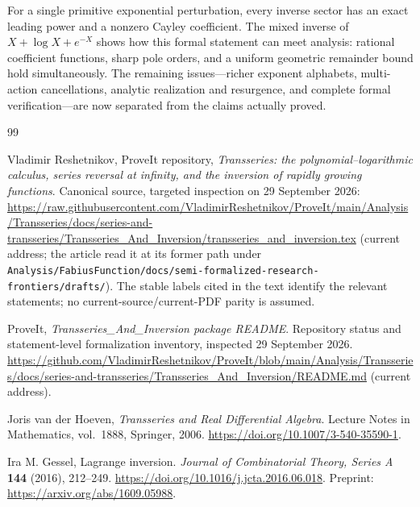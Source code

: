 \documentclass[11pt,a4paper]{article}
\theoremstyle{definition}
\theoremstyle{remark}
\begin{document}
For a single primitive exponential perturbation, every inverse sector has
an exact leading power and a nonzero Cayley coefficient. The mixed inverse
of $X+\log X+e^{-X}$ shows how this formal statement can meet analysis:
rational coefficient functions, sharp pole orders, and a uniform geometric
remainder bound hold simultaneously. The remaining issues---richer exponent
alphabets, multi-action cancellations, analytic realization and resurgence,
and complete formal verification---are now separated from the claims
actually proved.

\begingroup
\small
\begin{thebibliography}{99}

Vladimir Reshetnikov, ProveIt repository,
\emph{Transseries: the polynomial--logarithmic calculus, series reversal at
infinity, and the inversion of rapidly growing functions}.
Canonical source, targeted inspection on 29 September 2026:
\url{https://raw.githubusercontent.com/VladimirReshetnikov/ProveIt/main/Analysis/Transseries/docs/series-and-transseries/Transseries_And_Inversion/transseries_and_inversion.tex}
(current address; the article read it at its former path under
\texttt{Analysis/FabiusFunction/docs/semi-formalized-research-frontiers/drafts/}).
The stable labels cited in the text identify the relevant statements;
no current-source/current-PDF parity is assumed.

ProveIt, \emph{Transseries\_And\_Inversion package README}.
Repository status and statement-level formalization inventory, inspected
29 September 2026.
\url{https://github.com/VladimirReshetnikov/ProveIt/blob/main/Analysis/Transseries/docs/series-and-transseries/Transseries_And_Inversion/README.md}
(current address).

Joris van der Hoeven, \emph{Transseries and Real Differential Algebra}.
Lecture Notes in Mathematics, vol.~1888, Springer, 2006.
\url{https://doi.org/10.1007/3-540-35590-1}.

Ira M. Gessel, Lagrange inversion.
\emph{Journal of Combinatorial Theory, Series A} \textbf{144} (2016),
212--249.
\url{https://doi.org/10.1016/j.jcta.2016.06.018}.
Preprint: \url{https://arxiv.org/abs/1609.05988}.


\end{thebibliography}
\end{document}
